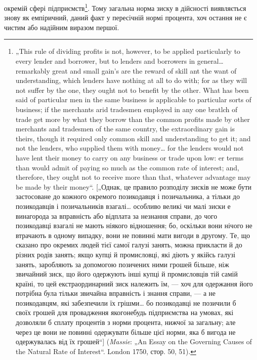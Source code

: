 \parcont{}  %
окремій сфері підприємств\footnote{
„This rule of dividing profits is not, however, to be applied particularly to
every lender and borrower, but to lenders and borrowers in general\dots{} remarkably
great and small gain's are the reward of skill ant the want of understanding, which
lenders have nothing at all to do with; for as they will not suffer by the one,
they ought not to benefit by the other. What has been said of particular men in
the same business is applicable to particular sorts of business; if the merchants
arid tradesmen employed in any one bratlch of trade get more by what they borrow
than the common profits made by other merchants and tradesmen of the same
country, the extraordinary gain is theirs, though it required only common skill
and understanding to get it; and not the lenders, who supplied them with money\dots{}
for the lenders would not have lent their money to carry on any business or trade
upon low: er terms than would admit of paying so much as the common rate of
interest; and, therefore, they ought not to receive more than that, whatever advantage
may be made by their money“. [„Однак, це правило розподілу зисків не
може бути застосоване до кожного окремого позикодавця і позичальника, а
тільки до позикодавців і позичальників взагалі\dots{} особливо великі чи малі зиски
е винагорода за вправність або відплата за незнання справи, до чого позикодавці
взагалі не мають ніякого відношення; бо, оскільки вони нічого не втрачають
в одному випадку, вони не повинні мати вигоди в другому. Те, що сказано
про окремих людей тієї самої галузі занять, можна прикласти й до різних
родів занять; якщо купці й промисловці, які діють у якійсь галузі занять, заробляють
за допомогою позичених ними грошей більше, ніж звичайний зиск,
що його одержують інші купці й промисловців тій самій країні, то цей екстраординарний
зиск належить їм, — хоч для одержання його потрібна була тільки
звичайна вправність і знання справи, — а не позикодавцям, які забезпечили
їх грішми\dots{} бо позикодавці не позичили б своїх грошей для провадження якогонебудь
підприємства на умовах, які дозволяли б сплату процентів з норми
процента, нижчої за загальну; але через це вони не повинні одержувати більше
цієї норми, яка б вигода не одержувалась від їх грошей“] (\emph{Massie}: „An
Essay on the Governing Causes of the Natural Rate of Interest“. London 1750,
стор. 50, 51).
}. Тому загальна норма зиску в дійсності
виявляється знову як емпіричний, даний факт у пересічній
нормі процента, хоч остання не є чистим або надійним виразом
першої.

